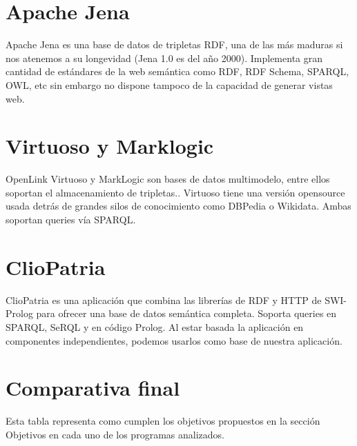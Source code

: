 \documentclass[12pt]{report} %
\begin{document}
\section{Apache Jena}
Apache Jena es una base de datos de tripletas RDF, una de las más maduras si nos atenemos a su longevidad (Jena 1.0 es del año 2000).\cite{couchdb}
Implementa gran cantidad de estándares de la web semántica como RDF, RDF Schema, SPARQL, OWL, etc sin embargo no dispone tampoco de la capacidad de generar vistas web.

\section{Virtuoso y Marklogic}
OpenLink Virtuoso y MarkLogic son bases de datos multimodelo, entre ellos soportan el almacenamiento de tripletas.\cite{virtuoso}\cite{marklogic}.
Virtuoso tiene una versión opensource usada detrás de grandes silos de conocimiento como DBPedia o Wikidata. Ambas soportan queries vía SPARQL.

\section{ClioPatria}
ClioPatria es una aplicación que combina las librerías de RDF y HTTP de SWI-Prolog para ofrecer una base de datos semántica completa.\cite{cliopatria}
Soporta queries en SPARQL, SeRQL y en código Prolog. Al estar basada la aplicación en componentes independientes, podemos usarlos como base
de nuestra aplicación.

\section{Comparativa final}

Esta tabla representa como cumplen los objetivos propuestos en la sección Objetivos en cada uno de los programas analizados.
\end{document}
